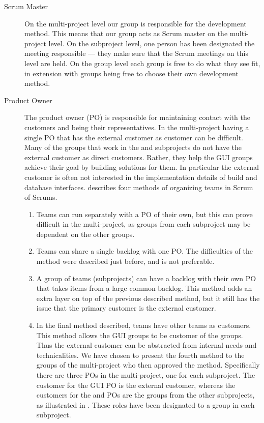 \begin{description}
  \item[Scrum Master] On the multi-project level our group is responsible for the development method. This means that our group acts as Scrum master on the multi-project level. On the subproject level, one person has been designated the meeting responsible --- they make sure that the Scrum meetings on this level are held. On the group level each group is free to do what they see fit, in extension with groups being free to choose their own development method.
  \item[Product Owner] The product owner (PO) is responsible for maintaining contact with the customers and being their representatives. In the multi-project having a single PO that has the external customer as customer can be difficult. Many of the groups that work in the \bd and \db subprojects do not have the external customer as direct customers. Rather, they help the GUI groups achieve their goal by building solutions for them. In particular the external customer is often not interested in the implementation details of build and database interfaces. \textcite{bird_davies_2007} describes four methods of organizing teams in Scrum of Scrums.
  \begin{enumerate}
    \item Teams can run separately with a PO of their own, but this can prove difficult in the multi-project, as groups from each subproject may be dependent on the other groups.
    \item Teams can share a single backlog with one PO. The difficulties of the method were described just before, and is not preferable.
    \item A group of teams (subprojects) can have a backlog with their own PO that takes items from a large common backlog. This method adds an extra layer on top of the previous described method, but it still has the issue that the primary customer is the external customer.
    \item In the final method described, teams have other teams as customers. This method allows the GUI groups to be customer of the \bd groups. Thus the external customer can be abstracted from internal needs and technicalities.
  We have chosen to present the fourth method to the groups of the multi-project who then approved the method. Specifically there are three POs in the multi-project, one for each subproject. The customer for the GUI PO is the external customer, whereas the customers for the \db and \bd POs are the groups from the other subprojects, as illustrated in . These roles have been designated to a group in each subproject.
  \end{enumerate}
\end{description}

